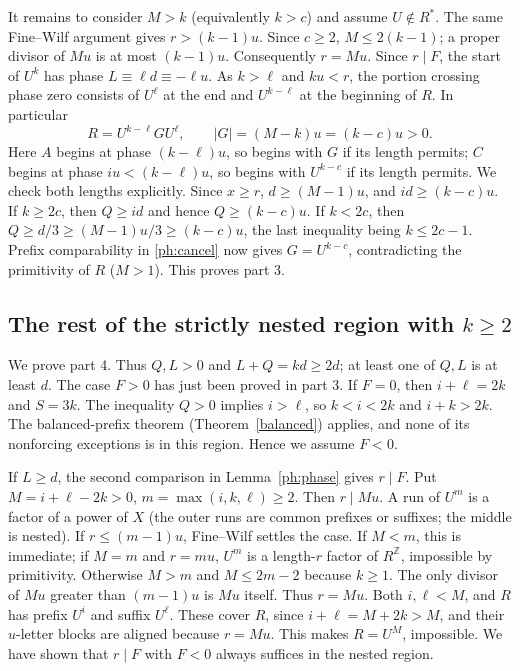 \documentclass[10pt]{article}
\theoremstyle{remark}\newtheorem*{remark}{Remark}
\begin{document}
It remains to consider $M>k$ (equivalently $k>c$) and assume
$U\notin R^*$. The same Fine--Wilf argument gives $r>(k-1)u$.
Since $c\ge2$, $M\le2(k-1)$; a proper divisor of $Mu$ is at most
$(k-1)u$. Consequently $r=Mu$. Since $r\mid F$, the start of
$U^k$ has phase $L\equiv\ell d\equiv-\ell u$. As $k>\ell$ and
$ku<r$, the portion crossing phase zero consists of $U^\ell$ at the
end and $U^{k-\ell}$ at the beginning of $R$. In particular
\[
 R=U^{k-\ell}G U^\ell,
 \qquad |G|=(M-k)u=(k-c)u>0.
\]
Here $A$ begins at phase $(k-\ell)u$, so begins with $G$ if its
length permits; $C$ begins at phase $iu<(k-\ell)u$, so begins with
$U^{k-c}$ if its length permits. We check both lengths explicitly.
Since $x\ge r$, $d\ge(M-1)u$, and $id\ge(k-c)u$. If $k\ge2c$,
then $Q\ge id$ and hence $Q\ge(k-c)u$. If $k<2c$, then
$Q\ge d/3\ge(M-1)u/3\ge(k-c)u$, the last inequality being
$k\le2c-1$. Prefix comparability in \eqref{ph:cancel} now gives
$G=U^{k-c}$, contradicting the primitivity of $R$ ($M>1$).
This proves part 3.

\subsection{The rest of the strictly nested region with $k\ge2$}
We prove part 4. Thus $Q,L>0$ and $L+Q=kd\ge2d$; at least one of
$Q,L$ is at least $d$. The case $F>0$ has just been proved in part 3.
If $F=0$, then $i+\ell=2k$ and $S=3k$. The inequality $Q>0$ implies
$i>\ell$, so $k<i<2k$ and $i+k>2k$. The balanced-prefix theorem
(Theorem~\ref{balanced}) applies, and none of its nonforcing exceptions
is in this region. Hence we assume $F<0$.

If $L\ge d$, the second comparison in Lemma~\ref{ph:phase} gives
$r\mid F$. Put $M=i+\ell-2k>0$, $m=\max(i,k,\ell)\ge2$. Then
$r\mid Mu$. A run of $U^m$ is a factor of a power of $X$ (the outer
runs are common prefixes or suffixes; the middle is nested).
If $r\le(m-1)u$, Fine--Wilf settles the case. If $M<m$, this is
immediate; if $M=m$ and $r=mu$, $U^m$ is a length-$r$ factor of
$R^{\mathbb Z}$, impossible by primitivity. Otherwise $M>m$ and
$M\le2m-2$ because $k\ge1$. The only divisor of $Mu$ greater than
$(m-1)u$ is $Mu$ itself. Thus $r=Mu$. Both $i,\ell<M$, and $R$
has prefix $U^i$ and suffix $U^\ell$. These cover $R$, since
$i+\ell=M+2k>M$, and their $u$-letter blocks are aligned because
$r=Mu$. This makes $R=U^M$, impossible. We have shown that $r\mid F$
with $F<0$ always suffices in the nested region.
\end{document}
